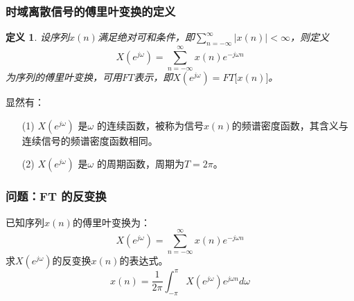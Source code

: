 \documentclass[notheorems,compress,mathserif,table]{beamer}
\newtheorem{definition}{定义}
\begin{document}
\begin{frame}[shrink]\frametitle{时域离散信号的傅里叶变换的定义}%


\begin{definition}
设序列$x(n)$满足绝对可和条件，即$\sum_{n=-\infty}^{\infty}|x(n)|<\infty$，则定义
\begin{equation*}
	X(e^{j\omega}) = \sum_{n=-\infty}^{\infty}x(n)e^{-j\omega n}
\end{equation*}
为序列的傅里叶变换，可用$FT$表示，即$X(e^{j\omega}) = FT\big[x(n)\big]$。
\end{definition}
\pause
\par 显然有：
\begin{enumerate}
\item [(1)] $X(e^{j\omega})$ 是$\omega$ 的连续函数，被称为信号$x(n)$的频谱密度函数，其含义与连续信号的频谱密度函数相同。
\item [(2)] $X(e^{j\omega})$ 是$\omega$ 的周期函数，周期为$T=2\pi$。
\end{enumerate}

\end{frame}




\begin{frame}[shrink]\frametitle{问题：FT 的反变换}%

已知序列$x(n)$的傅里叶变换为：
\begin{equation*}
X(e^{j\omega}) = \sum_{n=-\infty}^{\infty}x(n)e^{-j\omega n}
\end{equation*}
求$ X(e^{j\omega})$的反变换$x(n)$的表达式。%
\begin{equation*}
x(n) = \frac{1}{2\pi}\int_{-\pi}^{\pi}X(e^{j\omega})e^{j\omega n}d\omega
\end{equation*}

\end{frame}
\end{document}
